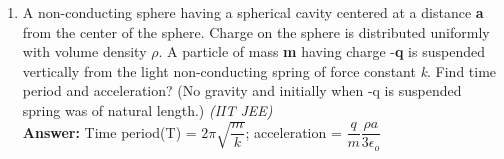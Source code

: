 \begin{enumerate}
\item A non-conducting sphere having a spherical cavity centered at a distance \textbf{a} from the center of the sphere. Charge on the sphere is distributed uniformly with volume density $\rho$. A particle of mass \textbf{m} having charge -\textbf{q} is suspended vertically from the light non-conducting spring of force constant \textit{k}. Find time period and acceleration? (No gravity and initially when -q is suspended spring was of natural length.) 
\hfill \textsl{(IIT JEE)} \\
\textbf{Answer:} Time period(T) = $2\pi \sqrt{\dfrac{m}{k}}$; acceleration = $\dfrac{q}{m}$$\dfrac{\rho a}{3 \epsilon_o}$
\end{enumerate}
